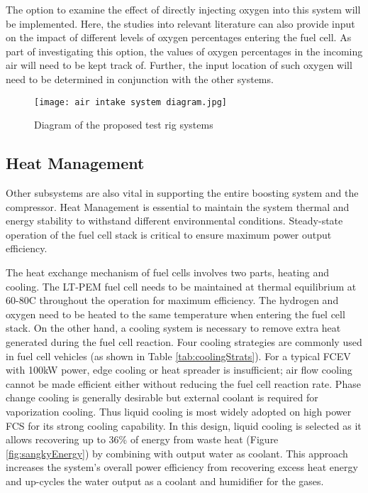 \documentclass[a4paper,11pt]{article}
\begin{document}
The option to examine the effect of directly injecting oxygen into this system will be implemented. Here, the studies into relevant literature can also provide input on the impact of different levels of oxygen percentages entering the fuel cell. As part of investigating this option, the values of oxygen percentages in the incoming air will need to be kept track of. Further, the input location of such oxygen will need to be determined in conjunction with the other systems.  

\begin{figure}[h]
    \texttt{[image: air intake system diagram.jpg]}
    \caption{Diagram of the proposed test rig systems}
    \centering
    \label{fig:airIntakeSys}  
\end{figure}


\subsection{Heat Management}

Other subsystems are also vital in supporting the entire boosting system and the compressor. Heat Management is essential to maintain the system thermal and energy stability to withstand different environmental conditions. Steady-state operation of the fuel cell stack is critical to ensure maximum power output efficiency.  

The heat exchange mechanism of fuel cells involves two parts, heating and cooling. The LT-PEM fuel cell needs to be maintained at thermal equilibrium at 60-80\degree C throughout the operation for maximum efficiency. The hydrogen and oxygen need to be heated to the same temperature when entering the fuel cell stack. On the other hand, a cooling system is necessary to remove extra heat generated during the fuel cell reaction. Four cooling strategies are commonly used in fuel cell vehicles (as shown in Table \ref{tab:coolingStrats}). For a typical FCEV with 100kW power, edge cooling or heat spreader is insufficient; air flow cooling cannot be made efficient either without reducing the fuel cell reaction rate\cite{wenthermalmanagement}. Phase change cooling is generally desirable but external coolant is required for vaporization cooling. Thus liquid cooling is most widely adopted on high power FCS for its strong cooling capability\cite{nguyen2020proton}.  In this design, liquid cooling is selected as it allows recovering up to 36\% of energy from waste heat (Figure \ref{fig:sangkyEnergy}) by combining with output water as coolant. This approach increases the system's overall power efficiency from recovering excess heat energy and up-cycles the water output as a coolant and humidifier for the gases. 
\end{document}
